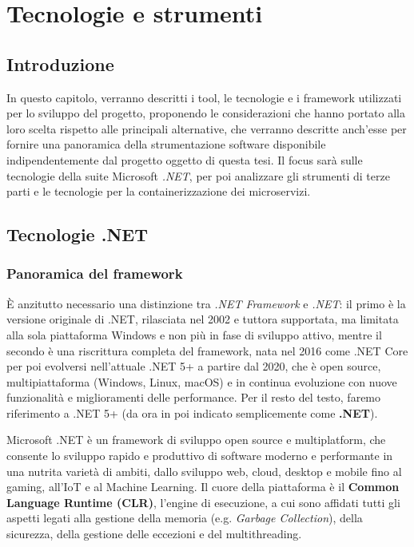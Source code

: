 \chapter{Tecnologie e strumenti}
\section{Introduzione}
In questo capitolo, verranno descritti i tool, le tecnologie e i framework utilizzati per lo sviluppo del progetto, proponendo le considerazioni che hanno portato alla loro scelta rispetto alle principali alternative, che verranno descritte anch'esse per fornire una panoramica della strumentazione software disponibile indipendentemente dal progetto oggetto di questa tesi.
Il focus sarà sulle tecnologie della suite Microsoft \emph{.NET}, per poi analizzare gli strumenti di terze parti e le tecnologie per la containerizzazione dei microservizi.

\section{Tecnologie .NET}
\subsection{Panoramica del framework}
È anzitutto necessario una distinzione tra \emph{.NET Framework} e \emph{.NET}: il primo è la versione originale di .NET, rilasciata nel 2002 e tuttora supportata, ma limitata alla sola piattaforma Windows e non più in fase di sviluppo attivo, mentre il secondo è una riscrittura completa del framework, nata nel 2016 come .NET Core per poi evolversi nell'attuale .NET 5+ a partire dal 2020, che è open source, multipiattaforma (Windows, Linux, macOS) e in continua evoluzione con nuove funzionalità e miglioramenti delle performance. Per il resto del testo, faremo riferimento a .NET 5+ (da ora in poi indicato semplicemente come \textbf{.NET}).

Microsoft .NET è un framework di sviluppo open source e multiplatform, che consente lo sviluppo rapido e produttivo di software moderno e performante in una nutrita varietà di ambiti, dallo sviluppo web, cloud, desktop e mobile fino al gaming, all'IoT e al Machine Learning.
Il cuore della piattaforma è il \textbf{Common Language Runtime (CLR)}, l'engine di esecuzione, a cui sono affidati tutti gli aspetti legati alla gestione della memoria (e.g. \emph{Garbage Collection}), della sicurezza, della gestione delle eccezioni e del multithreading.

